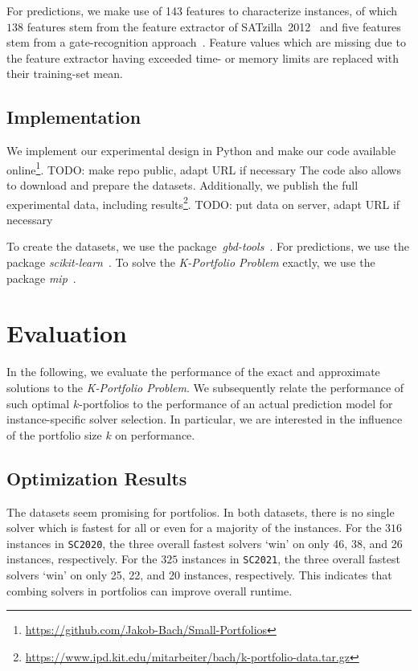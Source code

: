 \documentclass[conference]{IEEEtran}
\newcommand{\todo}[1]{{\color{red}TODO: #1}}
\begin{document}
For predictions, we make use of 143 features to characterize instances, of which 
$138$ features stem from the feature extractor of SATzilla~2012~\cite{xu2008satzilla, xu2012satzilla2012} and five features stem from a gate-recognition approach~\cite{Iser:2015:GateRecognition}. 
Feature values which are missing due to the feature extractor having exceeded time- or memory limits are replaced with their training-set mean. 

\subsection{Implementation}

We implement our experimental design in Python and make our code available online\footnote{\url{https://github.com/Jakob-Bach/Small-Portfolios}}.
\todo{make repo public, adapt URL if necessary}
The code also allows to download and prepare the datasets.
Additionally, we publish the full experimental data, including results\footnote{\url{https://www.ipd.kit.edu/mitarbeiter/bach/k-portfolio-data.tar.gz}}.
\todo{put data on server, adapt URL if necessary}

To create the datasets, we use the package~\emph{gbd-tools}~\cite{iser2020collaborative}.
For predictions, we use the package \emph{scikit-learn}~\cite{scikit-learn}.
To solve the \emph{K-Portfolio Problem} exactly, we use the package \emph{mip}~\cite{python-mip}.

\section{Evaluation}
\label{sec:evaluation}

In the following, we evaluate the performance of the exact and approximate solutions to the \emph{K-Portfolio Problem}. 
We subsequently relate the performance of such optimal $k$-portfolios to the performance of an actual prediction model for instance-specific solver selection. 
In particular, we are interested in the influence of the portfolio size $k$ on performance. 

\subsection{Optimization Results}

The datasets seem promising for portfolios.
In both datasets, there is no single solver which is fastest for all or even for a majority of the instances.
For the $316$ instances in \texttt{SC2020}, the three overall fastest solvers `win' on only 46, 38, and 26 instances, respectively.
For the $325$ instances in \texttt{SC2021}, the three overall fastest solvers `win' on only 25, 22, and 20 instances, respectively.
This indicates that combing solvers in portfolios can improve overall runtime.
\end{document}
